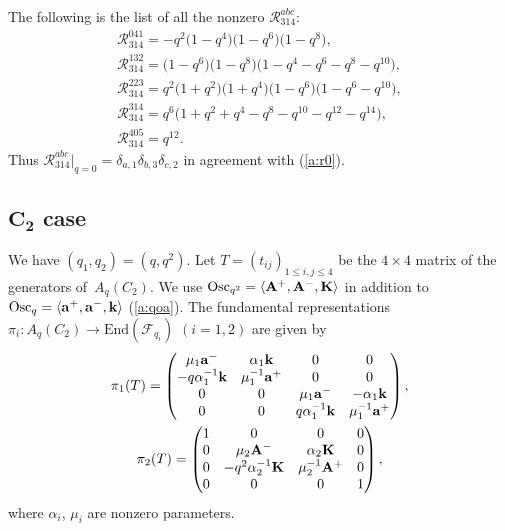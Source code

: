 \documentclass[11pt]{article}
\begin{document}
\begin{example}\label{a:ex:a21}
The following is the list of all the nonzero $\mathscr{R}^{abc}_{314}$:
\begin{gather*}
\mathscr{R}^{041}_{314}  = -q^2 \big(1 - q^4\big) \big(1 - q^6\big) \big(1 - q^8\big), \\
%
\mathscr{R}^{132}_{314}  =\big(1 - q^6\big) \big(1 - q^8\big)\big(1 - q^4 - q^6 - q^8 - q^{10}\big),\\
%
\mathscr{R}^{223}_{314}  = q^2 \big(1 + q^2\big) \big(1 + q^4\big) \big(1 - q^6\big) \big(1 - q^6 - q^{10}\big), \\
%
\mathscr{R}^{314}_{314}  =q^6\big(1 + q^2 + q^4 - q^8 - q^{10} - q^{12} - q^{14}\big),\\
%
\mathscr{R}^{405}_{314}  =q^{12}.
\end{gather*}
Thus $\mathscr{R}^{abc}_{314}|_{q=0}=\delta_{a,1}\delta_{b,3}\delta_{c,2}$
in agreement with (\ref{a:r0}).
\end{example}


\subsection[$C_2$ case]{$\boldsymbol{C_2}$ case}\label{a:ss:c2}

We have $(q_1,q_2)=(q,q^2)$.
Let $T=(t_{ij})_{1\le i,j \le 4}$ be the
$4\times 4$ matrix of the generators of~$A_q(C_2)$.
We  use
$\mathrm{Osc}_{q^2} =
\langle  {\rm{\bf A}}^+, {\rm{\bf A}}^-, {\rm{\bf K}} \rangle$
in addition to
$\mathrm{Osc}_q =
\langle  {\rm{\bf a}}^+, {\rm{\bf a}}^-, {\rm{\bf k}} \rangle$
(\ref{a:qoa}).
The fundamental representations
$\pi_i: A_q(C_2) \rightarrow \mathrm{End}(\mathcal{F}_{q_i})$
$(i=1,2)$ are given by
\begin{gather}
\pi_1(T) =
\begin{pmatrix}
\mu_1{\rm{\bf a}}^- & \alpha_1{\rm {\bf k}} &  0& 0\\
-q\alpha^{-1}_1{\rm {\bf k}}& \mu^{-1}_1{\rm{\bf a}}^+ &  0& 0\\
0 & 0 & \mu_1{\rm{\bf a}}^- & -\alpha_1{\rm {\bf k}} \\
0 & 0 & q\alpha_1^{-1}{\rm {\bf k}} & \mu_1^{-1}{\rm{\bf a}}^+
\end{pmatrix},
\nonumber\\
\pi_2(T) =
\begin{pmatrix}
1  & 0 & 0 & 0 \\
0 & \mu_2{\rm{\bf A}}^- & \alpha_2{\rm{\bf K}} & 0 \\
0 & -q^2\alpha^{-1}_2{\rm{\bf K}} & \mu_2^{-1}{\rm{\bf A}}^+ & 0 \\
0 & 0 & 0  & 1
\end{pmatrix},\label{a:piTc}
\end{gather}
where $\alpha_i$, $\mu_i$ are nonzero parameters.
\end{document}
